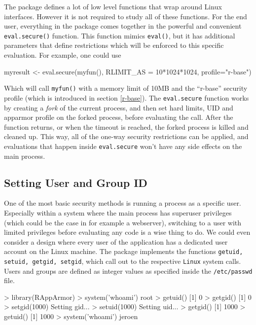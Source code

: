 \documentclass[article]{jss}
\begin{document}
The package defines a lot of low level functions that wrap around Linux
 interfaces. However it is not required to study all of these
functions. For the end user, everything in the package comes together in the
powerful and convenient \texttt{eval.secure()} function. This function mimics
\texttt{eval()}, but it has additional parameters that define restrictions
which will be enforced to this specific evaluation. For example, one could use

\begin{CodeChunk}
\begin{CodeInput}
myresult <- eval.secure(myfun(), RLIMIT_AS = 10*1024*1024, profile="r-base")
\end{CodeInput}
\end{CodeChunk}

Which will call \texttt{myfun()} with a memory limit of 10MB and the ``r-base''
security profile (which is introduced in section \ref{r-base}). The
\texttt{eval.secure} function works by creating a \emph{fork} of the current process, and then set hard limits, UID and apparmor profile on the forked process, before evaluating the call. After the function
returns, or when the timeout is reached, the forked process is killed and
cleaned up. This way, all of the one-way security restrictions can be applied,
and evaluations that happen inside \texttt{eval.secure} won't have
any side effects on the main process.

\subsection{Setting User and Group ID}

One of the most basic security methods is running a process as a specific user.
Especially within a system where the main process has superuser privileges
(which could be the case in for example a webserver), switching to a user with
limited privileges before evaluating any code is a wise thing to do. We could
even consider a design where every user of the application has a dedicated
user account on the Linux machine. The  package implements the
functions \texttt{getuid, setuid, getgid, setgid}, which call out to the
respective \texttt{Linux} system calls. Users and groups are defined as integer
values as specified inside the \texttt{/etc/passwd} file.

\begin{CodeChunk}
\begin{CodeInput}
> library(RAppArmor)
> system('whoami')
root
> getuid()
[1] 0
> getgid()
[1] 0
> setgid(1000)
Setting gid...
> setuid(1000)
Setting uid...
> getgid()
[1] 1000
> getuid()
[1] 1000
> system('whoami')
jeroen
\end{CodeInput}
\end{CodeChunk}
\end{document}
